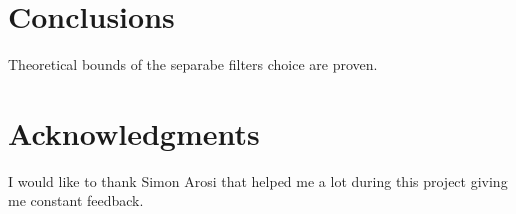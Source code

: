 \documentclass{article} %
\begin{document}
\section{Conclusions}
Theoretical bounds of the separabe filters choice are proven.


\section*{Acknowledgments}
I would like to thank Simon Arosi that helped me a lot during this project giving me constant feedback.



\end{document}
